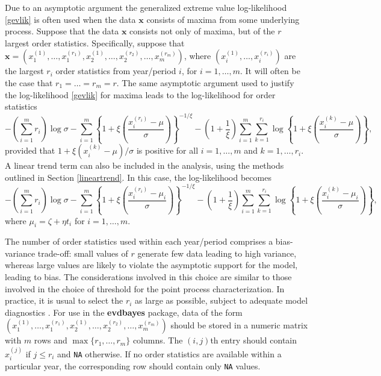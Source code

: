 \documentclass[11pt,a4paper]{article}
\newcommand{\bs}{\boldsymbol}
\begin{document}
Due to an asymptotic argument \citep[e.g.][]{cole01} the generalized
extreme value log-likelihood \eqref{gevlik} is often used when the
data $\bs{x}$ consists of maxima from some underlying process.
Suppose that the data $\bs{x}$ consists not only of maxima, but of the
$r$ largest order statistics.  Specifically, suppose that $\bs{x} =
(x_1^{(1)}, \dots, x_1^{(r_1)}, x_2^{(1)}, \dots, x_2^{(r_2)}, \dots,
x_m^{(r_m)})$, where $(x_i^{(1)}, \dots, x_i^{(r_i)})$ are the largest
$r_i$ order statistics from year/period $i$, for $i=1,\dots,m$.  It
will often be the case that $r_1 = \dots = r_m = r$.  The same
asymptotic argument used to justify the log-likelihood \eqref{gevlik}
for maxima leads to the log-likelihood for order statistics
\begin{equation*}
  -\left(\sum_{i=1}^m r_i\right)\log \sigma - \sum_{i=1}^{m} \left\{1
    + \xi\left(\frac{x_i^{(r_i)}-\mu}{\sigma}\right)\right\}^{-1/\xi}
  - \left(1+\frac{1}{\xi}\right) \sum_{i=1}^{m} \sum_{k=1}^{r_i}
  \log\left\{1 + \xi\left(\frac{x_i^{(k)}-\mu}{\sigma}\right)\right\}, 
\end{equation*}
provided that $1 + \xi(x_i^{(k)}-\mu)/\sigma$ is positive for all
$i=1,\dots,m$ and $k = 1,\dots,r_i$.  A linear trend term can also be
included in the analysis, using the methods outlined in Section
\ref{lineartrend}.  In this case, the log-likelihood becomes
\begin{equation*}
  -\left(\sum_{i=1}^m r_i\right)\log \sigma - \sum_{i=1}^{m} \left\{1
    +
    \xi\left(\frac{x_i^{(r_i)}-\mu_i}{\sigma}\right)\right\}^{-1/\xi}
  - \left(1+\frac{1}{\xi}\right) \sum_{i=1}^{m} \sum_{k=1}^{r_i}
  \log\left\{1 +
    \xi\left(\frac{x_i^{(k)}-\mu_i}{\sigma}\right)\right\}, 
\end{equation*}
where $\mu_i = \zeta + \eta t_i$ for $i=1,\dots,m$.
 
The number of order statistics used within each year/period comprises
a bias-variance trade-off: small values of $r$ generate few data
leading to high variance, whereas large values are likely to violate
the asymptotic support for the model, leading to bias.  The
considerations involved in this choice are similar to those involved
in the choice of threshold for the point process characterization.  In
practice, it is usual to select the $r_i$ as large as possible,
subject to adequate model diagnostics \citep{cole01}.  For use in the
\textbf{evdbayes} package, data of the form $(x_1^{(1)}, \dots,
x_1^{(r_1)}, x_2^{(1)}, \dots, x_2^{(r_2)}, \dots, x_m^{(r_m)})$
should be stored in a numeric matrix with $m$ rows and
$\max\{r_1,\dots,r_m\}$ columns.  The $(i,j)$th entry should contain
$x_i^{(j)}$ if $j \leq r_i$ and \verb+NA+ otherwise.  If no order
statistics are available within a particular year, the corresponding
row should contain only \verb+NA+ values.
\end{document}
